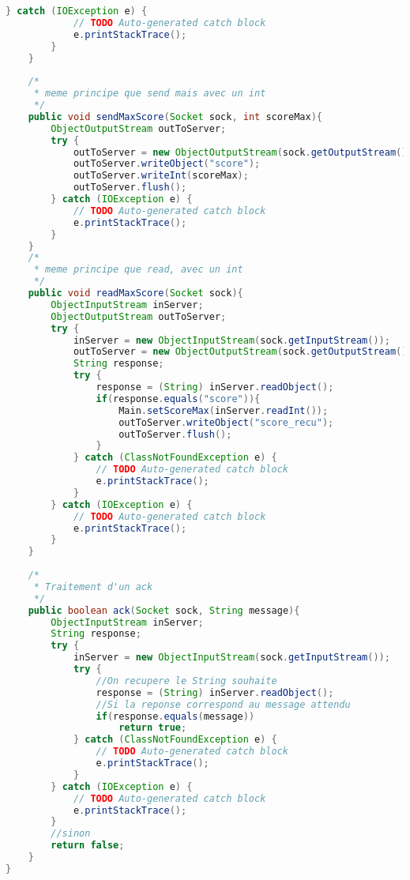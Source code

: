 \begin{lstlisting}[language=Java]
		} catch (IOException e) {
			// TODO Auto-generated catch block
			e.printStackTrace();
		}               
	}
	
	/*
	 * meme principe que send mais avec un int
	 */
	public void sendMaxScore(Socket sock, int scoreMax){
		ObjectOutputStream outToServer;
		try {
			outToServer = new ObjectOutputStream(sock.getOutputStream());
			outToServer.writeObject("score");
			outToServer.writeInt(scoreMax);
			outToServer.flush();
		} catch (IOException e) {
			// TODO Auto-generated catch block
			e.printStackTrace();
		}
	}
	/*
	 * meme principe que read, avec un int
	 */
	public void readMaxScore(Socket sock){
		ObjectInputStream inServer;
		ObjectOutputStream outToServer;
		try {
			inServer = new ObjectInputStream(sock.getInputStream());
			outToServer = new ObjectOutputStream(sock.getOutputStream());
			String response;
			try {
				response = (String) inServer.readObject();
				if(response.equals("score")){
					Main.setScoreMax(inServer.readInt());
					outToServer.writeObject("score_recu");
					outToServer.flush();
				}
			} catch (ClassNotFoundException e) {
				// TODO Auto-generated catch block
				e.printStackTrace();
			}
		} catch (IOException e) {
			// TODO Auto-generated catch block
			e.printStackTrace();
		}
	}
	
	/*
	 * Traitement d'un ack
	 */
	public boolean ack(Socket sock, String message){
		ObjectInputStream inServer;
		String response;
		try {
			inServer = new ObjectInputStream(sock.getInputStream());
			try {
				//On recupere le String souhaite
				response = (String) inServer.readObject();
				//Si la reponse correspond au message attendu
				if(response.equals(message))
					return true;
			} catch (ClassNotFoundException e) {
				// TODO Auto-generated catch block
				e.printStackTrace();
			}
		} catch (IOException e) {
			// TODO Auto-generated catch block
			e.printStackTrace();
		}
		//sinon
		return false;
	}
}
\end{lstlisting}